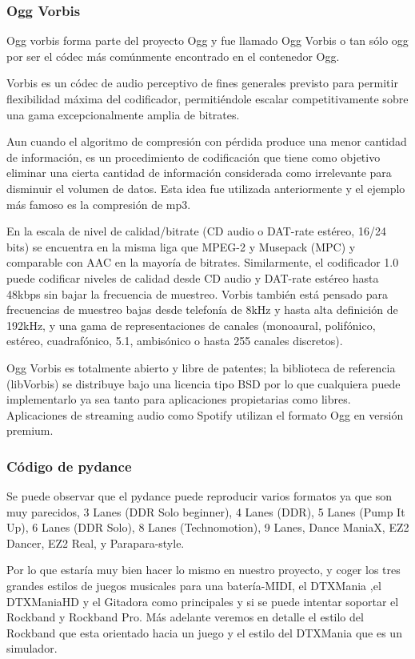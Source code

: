 \documentclass[a4paper,11pt,oneside]{book}
\begin{document}
\subsubsection{Ogg Vorbis} Ogg vorbis forma parte del proyecto Ogg y fue llamado Ogg Vorbis o tan sólo ogg por ser el códec más comúnmente encontrado en el contenedor Ogg.

Vorbis es un códec de audio perceptivo de fines generales previsto para permitir flexibilidad máxima del codificador, permitiéndole escalar competitivamente sobre una gama excepcionalmente amplia de bitrates.

Aun cuando el algoritmo de compresión con pérdida produce una menor cantidad de información, es un procedimiento de codificación que tiene como objetivo eliminar una cierta cantidad de información considerada como irrelevante para disminuir el volumen de datos. Esta idea fue utilizada anteriormente y el ejemplo más famoso es la compresión de mp3.

En la escala de nivel de calidad/bitrate (CD audio o DAT-rate estéreo, 16/24 bits) se encuentra en la misma liga que MPEG-2 y Musepack (MPC) y comparable con AAC en la mayoría de bitrates. Similarmente, el codificador 1.0 puede codificar niveles de calidad desde CD audio y DAT-rate estéreo hasta 48kbps sin bajar la frecuencia de muestreo. Vorbis también está pensado para frecuencias de muestreo bajas desde telefonía de 8kHz y hasta alta definición de 192kHz, y una gama de representaciones de canales (monoaural, polifónico, estéreo, cuadrafónico, 5.1, ambisónico o hasta 255 canales discretos).

Ogg Vorbis es totalmente abierto y libre de patentes; la biblioteca de referencia (libVorbis) se distribuye bajo una licencia tipo BSD por lo que cualquiera puede implementarlo ya sea tanto para aplicaciones propietarias como libres. Aplicaciones de streaming audio como Spotify utilizan el formato Ogg en versión premium.

\subsubsection{Código de pydance}

Se puede observar que el pydance puede reproducir varios formatos ya que son muy parecidos, 3 \gls{Lanes} (DDR Solo beginner), 4 \gls{Lanes} (DDR), 5 \gls{Lanes} (Pump It Up), 6 \gls{Lanes} (DDR Solo), 8 \gls{Lanes} (Technomotion), 9 \gls{Lanes}, Dance ManiaX, EZ2 Dancer, EZ2 Real, y Parapara-style.

Por lo que estaría muy bien hacer lo mismo en nuestro proyecto, y coger los tres grandes estilos de juegos musicales para una batería-MIDI, el DTXMania ,el DTXManiaHD y el Gitadora como principales y si se puede intentar soportar el Rockband y Rockband Pro. Más adelante veremos en detalle el estilo del Rockband que esta orientado hacia un juego y el estilo del DTXMania que es un simulador.
\end{document}
